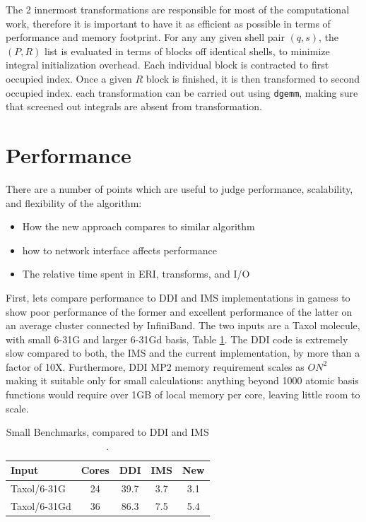 \documentclass[12pt]{article} \usepackage[margin=1in]{geometry}
\begin{document}
The 2 innermost transformations are responsible for most of the
computational work, therefore it is important to have it as efficient
as possible in terms of performance and memory footprint.  For any any
given shell pair $(q,s)$, the $(P,R)$ list is evaluated in terms of
blocks off identical shells, to minimize integral initialization
overhead.  Each individual block is contracted to first occupied
index.  Once a given $R$ block is finished, it is then transformed to
second occupied index.  each transformation can be carried out using
{\tt dgemm}, making sure that screened out integrals are absent from
transformation.

\section{Performance}
There are a number of points which are useful to judge performance,
scalability, and flexibility of the algorithm:

\begin{itemize}
\item How the new approach compares to similar algorithm
\item how to network interface affects performance
\item The relative time spent in ERI, transforms, and I/O
\end{itemize}

First, lets compare performance to DDI and IMS implementations in
gamess to show poor performance of the former and excellent
performance of the latter on an average cluster connected by
InfiniBand.  The two inputs are a Taxol molecule, with small 6-31G and
larger 6-31Gd basis, Table \ref{small}.  The DDI code is extremely slow
compared to both, the IMS and the current implementation, by more than a
factor of 10X.  Furthermore, DDI MP2 memory requirement scales as $ON^2$
making it suitable only for small calculations: anything beyond 1000
atomic basis functions would require over 1GB of local memory per
core, leaving little room to scale.

\begin{table}
  \label{small}
  \caption {Small Benchmarks, compared to
    DDI \cite{fletcher1997parallel} and IMS \cite {ishimura2006new}.}
  \begin{center}
    \begin{tabular}{| l | c | c | c | c |}
      \hline
      Input        & Cores & DDI   & IMS  & New  \\ 
      \hline
      Taxol/6-31G  & 24    & 39.7  & 3.7  &  3.1  \\
      Taxol/6-31Gd & 36    & 86.3  & 7.5  &  5.4 \\
      \hline
    \end{tabular}
  \end{center}
\end{table}
\end{document}
